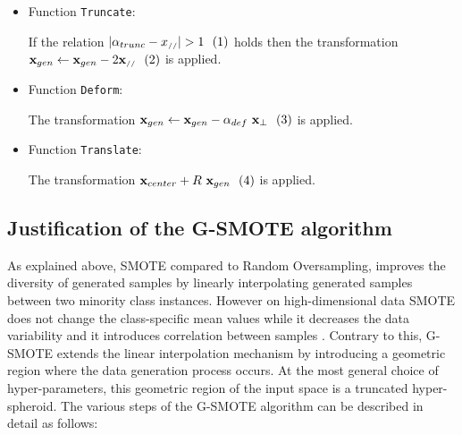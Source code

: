 \documentclass[parskip=full]{scrartcl}
\newcommand{\inlineeqnum}{\refstepcounter{equation}~~\mbox{(\theequation)}}
\begin{document}
\begin{itemize}
	 \item Function \texttt{Truncate}:
	 
	 	If the relation \( |\alpha_{trunc} - x_{\scriptscriptstyle//}| > 1
	 	\inlineeqnum\label{eqn:condition} \) holds then the transformation \(
	 	\textbf{x}_{gen} \leftarrow \textbf{x}_{gen} - 2
	 	\textbf{x}_{\scriptscriptstyle//} \inlineeqnum\label{eqn:truncate} \) is
	 	applied.
	
	\item Function \texttt{Deform}: 
			
		The transformation \( \textbf{x}_{gen} \leftarrow \textbf{x}_{gen} -
		\alpha_{def} \  \textbf{x}_{\bot} \inlineeqnum\label{eqn:deform} \) is
		applied.
			
	\item Function \texttt{Translate}:
	
		The transformation \( \textbf{x}_{center} +  R \ \textbf{x}_{gen}
		\inlineeqnum\label{eqn:translate} \) is applied.
	
\end{itemize}

\subsection{Justification of the G-SMOTE algorithm}

As explained above, SMOTE compared to Random Oversampling, improves the
diversity of generated samples by linearly interpolating generated samples
between two minority class instances. However on high-dimensional data SMOTE
does not change the class-specific mean values while it decreases the data
variability and it introduces correlation between samples \cite{Blagus2013}.
Contrary to this, G-SMOTE extends the linear interpolation mechanism by
introducing a geometric region where the data generation process occurs. At the
most general choice of hyper-parameters, this geometric region of the input
space is a truncated hyper-spheroid. The various steps of the G-SMOTE algorithm
can be described in detail as follows:
\end{document}
